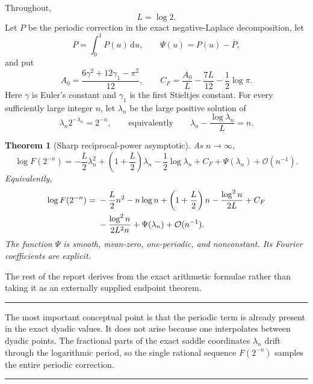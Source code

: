 \documentclass[11pt,oneside]{article}
\newtheorem{theorem}{Theorem}[section]
\theoremstyle{definition}
\theoremstyle{remark}
\newcommand{\dd}{\,\mathrm d}
\newcommand{\bigO}{\mathcal O}
\newenvironment{boxedremark}{%
  \par\smallskip\noindent\begin{center}\begin{minipage}{0.94\textwidth}%
  \color{black}\hrule\vspace{0.6em}\small
}{%
  \vspace{0.6em}\hrule\end{minipage}\end{center}\smallskip
}
\begin{document}
Throughout,
\begin{equation}
 L=\log2.                                                     \label{dyadicasym:eq:L}
\end{equation}
Let $P$ be the periodic correction in the exact negative-Laplace decomposition, let
\begin{equation}
 \overline P=\int_0^1P(u)\dd u,
 \qquad \Psi(u)=P(u)-\overline P,                            \label{dyadicasym:eq:Psi-intro}
\end{equation}
and put
\begin{equation}
 A_0=\frac{6\gamma^2+12\gamma_1-\pi^2}{12},
 \qquad
 C_F=\frac{A_0}{L}-\frac{7L}{12}-\frac12\log\pi.            \label{dyadicasym:eq:CF-intro}
\end{equation}
Here $\gamma$ is Euler's constant and $\gamma_1$ is the first Stieltjes constant.
For every sufficiently large integer $n$, let $\lambda_n$ be the large positive solution of
\begin{equation}
 \lambda_n2^{-\lambda_n}=2^{-n},
 \qquad\text{equivalently}\qquad
 \lambda_n-\frac{\log\lambda_n}{L}=n.                       \label{dyadicasym:eq:lambda-n-intro}
\end{equation}

\begin{theorem}[Sharp reciprocal-power asymptotic]
\label{dyadicasym:thm:headline}
As $n\to\infty$,
\begin{equation}
 \boxed{
 \log F(2^{-n})=
 -\frac L2\lambda_n^2+
 \left(1+\frac L2\right)\lambda_n-\frac12\log\lambda_n
 +C_F+\Psi(\lambda_n)+\bigO(n^{-1}).}                       \label{dyadicasym:eq:headline-compact}
\end{equation}
Equivalently,
\begin{align}
 \log F(2^{-n})={}&-\frac L2n^2-n\log n+
 \left(1+\frac L2\right)n-\frac{\log^2n}{2L}+C_F           \notag\\
 &-\frac{\log^2n}{2L^2n}+\Psi(\lambda_n)+\bigO(n^{-1}).   \label{dyadicasym:eq:headline-expanded}
\end{align}
The function $\Psi$ is smooth, mean-zero, one-periodic, and nonconstant.  Its Fourier
coefficients are explicit.
\end{theorem}

The rest of the report derives  from the exact arithmetic formulae rather
than taking it as an externally supplied endpoint theorem.

\begin{boxedremark}
The most important conceptual point is that the periodic term is already present in the exact
dyadic values.  It does not arise because one interpolates between dyadic points.  The
fractional parts of the exact saddle coordinates $\lambda_n$ drift through the logarithmic
period, so the single rational sequence $F(2^{-n})$ samples the entire periodic correction.
\end{boxedremark}
\end{document}
